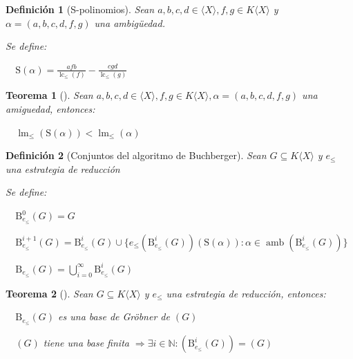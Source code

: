 \documentclass{amsbook}
\theoremstyle{customstyle}
\newtheorem{definition}{Definición}[section]
\newtheorem{theorem}{Teorema}[section]
\newcommand{\definición}[2][]{
  \begin{definition}[#1]
  \setlength{\parindent}{2em} %
  #2
  \end{definition}
}
\newcommand{\teorema}[2][]{
  \begin{theorem}[#1]
  \setlength{\parindent}{2em} %
  #2
  \end{theorem}
}
\DeclareMathOperator{\lm}{lm}
\DeclareMathOperator{\lc}{lc}
\DeclareMathOperator{\amb}{amb}
\begin{document}
\renewcommand{\S}{\text{S}}

\definición[S-polinomios] {
Sean $a, b, c, d ∈ ⟨X⟩, f, g ∈ K⟨X⟩$ y $α = (a, b, c, d, f, g)$ una ambigüedad.

Se define:

  $\S(α) = \frac{afb}{\lc_≤{(f)}} - \frac{cgd}{\lc_≤{(g)}}$
}

\teorema[]{
Sean $a, b, c, d ∈ ⟨X⟩, f, g ∈ K⟨X⟩, α = (a, b, c, d, f, g)$ una amiguedad, entonces:

  $\lm_≤{(\S(α))} < \lm_≤{(α)}$

}


\newcommand{\B}{\text{B}}

\definición[Conjuntos del algoritmo de Buchberger] {
Sean $G ⊆ K⟨X⟩$ y $e_≤$ una estrategia de reducción

Se define:

  $\B_{e_≤}^0(G) = G$

  $\B_{e_≤}^{i + 1}(G) = \B_{e_≤}^i(G) ∪ \{e_≤(\B_{e_≤}^i(G))(\S(α)) : α ∈ \amb(\B_{e_≤}^i(G))\}$

  $\B_{e_≤}(G) = \bigcup_{i = 0}^∞ \B_{e_≤}^i(G)$

}

\teorema[]{
  Sean $G ⊆ K⟨X⟩$ y $e_≤$ una estrategia de reducción, entonces:

  $\B_{e_≤}(G)$ es una base de Gröbner de $(G)$

  $(G)$ tiene una base finita $⇒ ∃i ∈ ℕ : (\B_{e_≤}^i(G)) = (G)$
}



\end{document}
